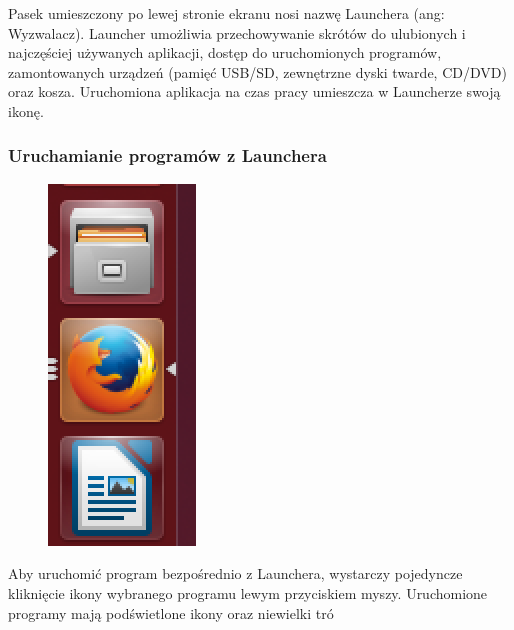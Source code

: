 Pasek umieszczony po lewej stronie ekranu nosi nazwę Launchera (ang: \textcolor{ubuntu_orange}{Wyzwalacz}). Launcher umożliwia przechowywanie skrótów do ulubionych i najczęściej używanych aplikacji, dostęp do uruchomionych programów, zamontowanych urządzeń (pamięć USB/SD, zewnętrzne dyski twarde, CD/DVD) oraz kosza. Uruchomiona aplikacja na czas pracy umieszcza w Launcherze swoją ikonę.

\subsubsection{Uruchamianie programów z Launchera}
\begin{figure}
	\vspace{-10pt}
	\includegraphics[width=\linewidth]{images/unity_launcher_programy.png}
\end{figure}

Aby uruchomić program bezpośrednio z Launchera, wystarczy pojedyncze kliknięcie ikony wybranego programu lewym przyciskiem myszy. Uruchomione programy mają podświetlone ikony oraz niewielki tró